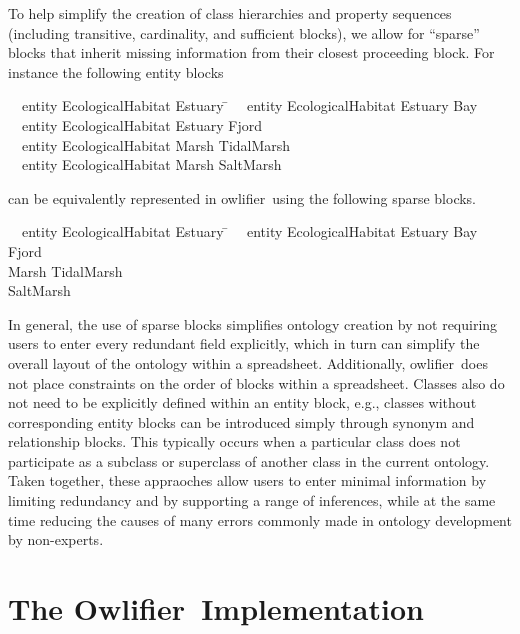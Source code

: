 \documentclass[5p,authoryear]{elsarticle}
\newcommand{\Owlifier}{\textsf{Owlifier}}
\newcommand{\owlifier}{\textsf{owlifier}}
\begin{document}
To help simplify the creation of class hierarchies and property
sequences (including transitive, cardinality, and sufficient blocks),
we allow for ``sparse'' blocks that inherit missing information from
their closest proceeding block. For instance the following entity
blocks
\begin{tabbing}
  ~~\textsf{entity} \= \textsf{EcologicalHabitat} \= \textsf{Estuary} \= \kill
  ~~\textsf{entity} \> \textsf{EcologicalHabitat} \> \textsf{Estuary} \> 
  \textsf{Bay}\\
  ~~\textsf{entity} \> \textsf{EcologicalHabitat} \> \textsf{Estuary} \>
  \textsf{Fjord} \\
  ~~\textsf{entity} \> \textsf{EcologicalHabitat} \> \textsf{Marsh} \>
  \textsf{TidalMarsh} \\ 
  ~~\textsf{entity} \> \textsf{EcologicalHabitat} \> \textsf{Marsh} \>
  \textsf{SaltMarsh}
\end{tabbing}
can be equivalently represented in \owlifier\ using the following
sparse blocks.
\begin{tabbing}
  ~~\textsf{entity} \= \textsf{EcologicalHabitat} \= \textsf{Estuary} \= \kill
  ~~\textsf{entity} \> \textsf{EcologicalHabitat} \> \textsf{Estuary} \> 
  \textsf{Bay}\\
  \> \> \> \textsf{Fjord} \\
  \> \> \textsf{Marsh} \> \textsf{TidalMarsh} \\ 
  \> \> \> \textsf{SaltMarsh}
\end{tabbing}
In general, the use of sparse blocks simplifies ontology creation by
not requiring users to enter every redundant field explicitly, which
in turn can simplify the overall layout of the ontology within a
spreadsheet.  Additionally, \owlifier\ does not place constraints on
the order of blocks within a spreadsheet. Classes also do not need to
be explicitly defined within an entity block, e.g., classes without
corresponding entity blocks can be introduced simply through synonym
and relationship blocks. This typically occurs when a particular class
does not participate as a subclass or superclass of another class in
the current ontology. Taken together, these appraoches allow users to
enter minimal information by limiting redundancy and by supporting a
range of inferences, while at the same time reducing the causes of
many errors commonly made in ontology development by non-experts.

\section{The \Owlifier\ Implementation}
\label{sec:implementation}
\end{document}

